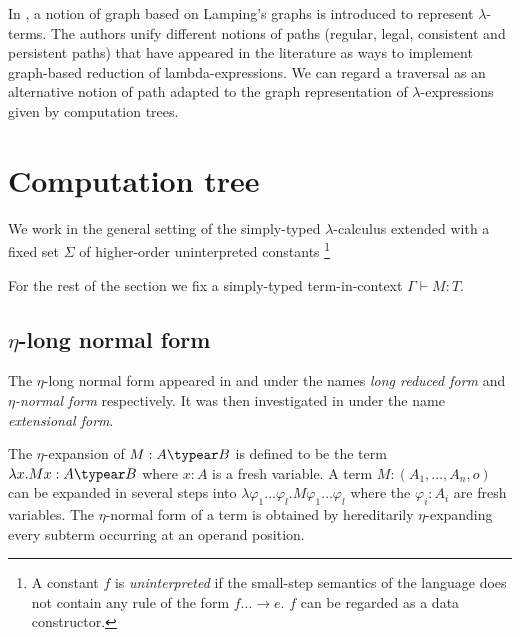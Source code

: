 In \cite{DBLP:conf/lics/AspertiDLR94}, a notion of graph based on
Lamping's graphs \citep{lamping} is introduced to represent
$\lambda$-terms. The authors unify different notions of paths
(regular, legal, consistent and persistent paths) that have appeared
in the literature as ways to implement graph-based reduction of
lambda-expressions. We can regard a traversal as an alternative
notion of path adapted to the graph representation of
$\lambda$-expressions given by computation trees.



%

\section{Computation tree}
We work in the general setting of the simply-typed
$\lambda$-calculus extended with a fixed set $\Sigma$ of
higher-order uninterpreted constants \footnote{A constant $f$ is
  \emph{uninterpreted} if the small-step semantics of the language
  does not contain any rule of the form $f \dots \rightarrow e$. $f$
  can be regarded as a data constructor.}

For the rest of the section we fix a simply-typed term-in-context
$\Gamma \vdash M :T$.

\subsection{$\eta$-long normal form}

The $\eta$-long normal form appeared in
\citep{DBLP:journals/tcs/JensenP76} and
\citep{DBLP:journals/tcs/Huet75} under the names \emph{long reduced
form} and \emph{$\eta$-normal form} respectively. It was then
investigated in \citep{huet76} under the name \emph{extensional
form}.

The $\eta$-expansion of $M: A\typear B$ is defined to be the term
$\lambda x . M x : A\typear B$ where $x:A$ is a fresh variable. A
term $M : (A_1,\ldots,A_n,o)$ can be expanded in several steps into
$\lambda \varphi_1 \ldots \varphi_l . M \varphi_1 \ldots \varphi_l$
where the $\varphi_i:A_i$ are fresh variables. The $\eta$-normal
form of a term is obtained by hereditarily $\eta$-expanding every
subterm occurring at an operand position.

